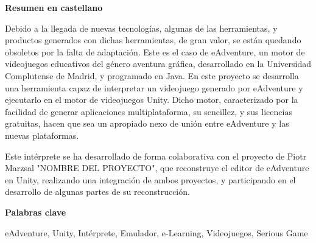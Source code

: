 
\newpage

\thispagestyle{empty}

\begin{center}

{\bf \Huge Resumen en castellano}

  \end{center}
\vspace{1cm}

Debido a la llegada de nuevas tecnologías, algunas de las herramientas, y productos generados con dichas herramientas, de gran valor, se están quedando obsoletos por la falta de adaptación. Este es el caso de eAdventure, un motor de videojuegos educativos del género aventura gráfica, desarrollado en la Universidad Complutense de Madrid, y programado en Java. En este proyecto se desarrolla una herramienta capaz de interpretar un videojuego generado por eAdventure y ejecutarlo en el motor de videojuegos Unity. Dicho motor, caracterizado por la facilidad de generar aplicaciones multiplataforma, su sencillez, y sus licencias gratuitas, hacen que sea un apropiado nexo de unión entre eAdventure y las nuevas plataformas.

Este intérprete se ha desarrollado de forma colaborativa con el proyecto de Piotr Marzsal "NOMBRE DEL PROYECTO", que reconstruye el editor de eAdventure en Unity, realizando una integración de ambos proyectos, y participando en el desarrollo de algunas partes de su reconstrucción.

\vspace{1cm}


\begin{center}

{\bf \Large Palabras clave}

   \end{center}

   \vspace{0.5cm}
   
eAdventure, Unity, Intérprete, Emulador, e-Learning, Videojuegos, Serious Game
   


